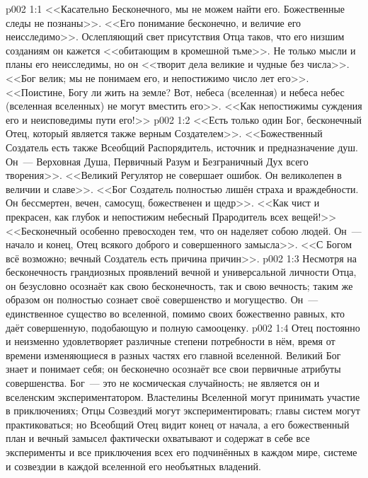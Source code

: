 \vs p002 1:1 <<Касательно Бесконечного, мы не можем найти его. Божественные следы не познаны>>. <<Его понимание бесконечно, и величие его неисследимо>>. Ослепляющий свет присутствия Отца таков, что его низшим созданиям он кажется <<обитающим в кромешной тьме>>. Не только мысли и планы его неисследимы, но он <<творит дела великие и чудные без числа>>. <<Бог велик; мы не понимаем его, и непостижимо число лет его>>. <<Поистине, Богу ли жить на земле? Вот, небеса (вселенная) и небеса небес (вселенная вселенных) не могут вместить его>>. <<Как непостижимы суждения его и неисповедимы пути его!>>
\vs p002 1:2 <<Есть только один Бог, бесконечный Отец, который является также верным Создателем>>. <<Божественный Создатель есть также Всеобщий Распорядитель, источник и предназначение душ. Он~--- Верховная Душа, Первичный Разум и Безграничный Дух всего творения>>. <<Великий Регулятор не совершает ошибок. Он великолепен в величии и славе>>. <<Бог Создатель полностью лишён страха и враждебности. Он бессмертен, вечен, самосущ, божественен и щедр>>. <<Как чист и прекрасен, как глубок и непостижим небесный Прародитель всех вещей!>> <<Бесконечный особенно превосходен тем, что он наделяет собою людей. Он~--- начало и конец, Отец всякого доброго и совершенного замысла>>. <<С Богом всё возможно; вечный Создатель есть причина причин>>.
\vs p002 1:3 \pc Несмотря на бесконечность грандиозных проявлений вечной и универсальной личности Отца, он безусловно осознаёт как свою бесконечность, так и свою вечность; таким же образом он полностью сознает своё совершенство и могущество. Он~--- единственное существо во вселенной, помимо своих божественно равных, кто даёт совершенную, подобающую и полную самооценку.
\vs p002 1:4 Отец постоянно и неизменно удовлетворяет различные степени потребности в нём, время от времени изменяющиеся в разных частях его главной вселенной. Великий Бог знает и понимает себя; он бесконечно осознаёт все свои первичные атрибуты совершенства. Бог~--- это не космическая случайность; не является он и вселенским экспериментатором. Властелины Вселенной могут принимать участие в приключениях; Отцы Созвездий могут экспериментировать; главы систем могут практиковаться; но Всеобщий Отец видит конец от начала, а его божественный план и вечный замысел фактически охватывают и содержат в себе все эксперименты и все приключения всех его подчинённых в каждом мире, системе и созвездии в каждой вселенной его необъятных владений.
